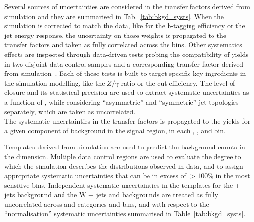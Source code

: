 Several sources of uncertainties are considered in the transfer factors 
derived from simulation and they are summarised in Tab.~\ref{tab:bkgd_systs}. 
When the simulation is corrected to match the data, 
like for the b-tagging efficiency or the jet energy response, 
the uncertainty on those weights is propagated to the transfer factors 
and taken as fully correlated across the bins. 
Other systematics effects are inspected through data-driven tests probing 
the compatibility of yields in two disjoint data control samples and 
a corresponding transfer factor derived from simulation~\cite{RA1Paper2012}. 
Each of these tests is built to target specific key ingredients in the simulation modelling, 
like the $Z / \gamma$ ratio or the \alphat cut efficiency. 
The level of closure and its statistical precision are 
used to extract systematic uncertainties as a function of \scalht, 
while considering ``asymmetric'' and ``symmetric'' jet topologies separately, 
which are taken as uncorrelated. \\
The systematic uncertainties in the transfer factors is propagated  
to the yields for a given component of background in the signal region, 
in each \njet, \nb, and \scalht bin. 

Templates derived from simulation are used to predict the background
counts in the \mht dimension. Multiple data control regions are used
to evaluate the degree to which the simulation describes the \mht
distributions observed in data, and to assign appropriate systematic
uncertainties that can be in excess of $>100\%$ in the most sensitive
\mht bins. Independent systematic uncertainties in the templates for
the \znunu + jets background and the W + jets and \ttbar backgrounds
are treated as fully uncorrelated across \njet and \nb categories and
\scalht bins, and with respect to the ``normalisation'' systematic
uncertainties summarised in Table~\ref{tab:bkgd_systs}.

